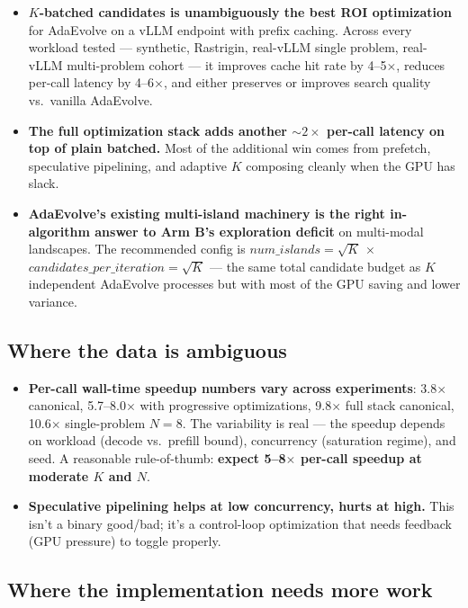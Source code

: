 \documentclass[11pt]{article}
\newcommand{\adaev}{AdaEvolve}
\begin{document}
\begin{itemize}
\item \textbf{$K$-batched candidates is unambiguously the best ROI
  optimization} for \adaev{} on a vLLM endpoint with prefix caching.
  Across every workload tested --- synthetic, Rastrigin, real-vLLM
  single problem, real-vLLM multi-problem cohort --- it improves
  cache hit rate by 4--5$\times$, reduces per-call latency by
  4--6$\times$, and either preserves or improves search quality
  vs.~vanilla \adaev{}.
\item \textbf{The full optimization stack adds another $\sim 2\times$
  per-call latency on top of plain batched.} Most of the additional
  win comes from prefetch, speculative pipelining, and adaptive $K$
  composing cleanly when the GPU has slack.
\item \textbf{\adaev{}'s existing multi-island machinery is the right
  in-algorithm answer to Arm B's exploration deficit} on multi-modal
  landscapes. The recommended config is $\textit{num\_islands} =
  \sqrt{K}$ $\times$ $\textit{candidates\_per\_iteration} = \sqrt{K}$
  --- the same total candidate budget as $K$ independent \adaev{}
  processes but with most of the GPU saving and lower variance.
\end{itemize}

\subsection{Where the data is ambiguous}

\begin{itemize}
\item \textbf{Per-call wall-time speedup numbers vary across
  experiments}: 3.8$\times$ canonical, 5.7--8.0$\times$ with
  progressive optimizations, 9.8$\times$ full stack canonical,
  10.6$\times$ single-problem $N{=}8$. The variability is real ---
  the speedup depends on workload (decode vs.~prefill bound),
  concurrency (saturation regime), and seed. A reasonable
  rule-of-thumb: \textbf{expect 5--8$\times$ per-call speedup at
  moderate $K$ and $N$}.
\item \textbf{Speculative pipelining helps at low concurrency, hurts
  at high.} This isn't a binary good/bad; it's a control-loop
  optimization that needs feedback (GPU pressure) to toggle properly.
\end{itemize}

\subsection{Where the implementation needs more work}
\end{document}
